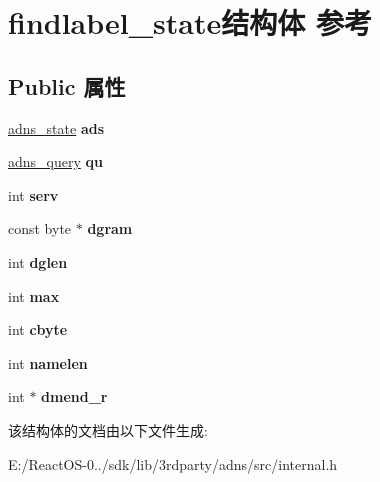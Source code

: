 \hypertarget{structfindlabel__state}{}\section{findlabel\+\_\+state结构体 参考}
\label{structfindlabel__state}
\subsection*{Public 属性}
\begin{DoxyCompactItemize}
\item 
\mbox{\label{structfindlabel__state_ac8352174120422ab78e25b1677db3439}} 
\hyperlink{structadns____state}{adns\+\_\+state} {\bfseries ads}
\item 
\mbox{\label{structfindlabel__state_ab0192edf3b7ee50de0de2c158a7f400b}} 
\hyperlink{structadns____query}{adns\+\_\+query} {\bfseries qu}
\item 
\mbox{\label{structfindlabel__state_a702cb647bce25ea8c8ad186377faaa8d}} 
int {\bfseries serv}
\item 
\mbox{\label{structfindlabel__state_a0f9c93ce718e53fdf7d78db971715713}} 
const byte $\ast$ {\bfseries dgram}
\item 
\mbox{\label{structfindlabel__state_aa2415523cfc5e9df91a903f810295b25}} 
int {\bfseries dglen}
\item 
\mbox{\label{structfindlabel__state_a2b5cc4266d5466236865fadc49d0888b}} 
int {\bfseries max}
\item 
\mbox{\label{structfindlabel__state_a1c27363c548465b1e229ac7a94393ec4}} 
int {\bfseries cbyte}
\item 
\mbox{\label{structfindlabel__state_a3b61b56802d7928396b48db7a39acad0}} 
int {\bfseries namelen}
\item 
\mbox{\label{structfindlabel__state_a0ee21de45230ab39b83bce24a8bf04a3}} 
int $\ast$ {\bfseries dmend\+\_\+r}
\end{DoxyCompactItemize}


该结构体的文档由以下文件生成\+:\begin{DoxyCompactItemize}
\item 
E\+:/\+React\+O\+S-\/0../sdk/lib/3rdparty/adns/src/internal.\+h\end{DoxyCompactItemize}
